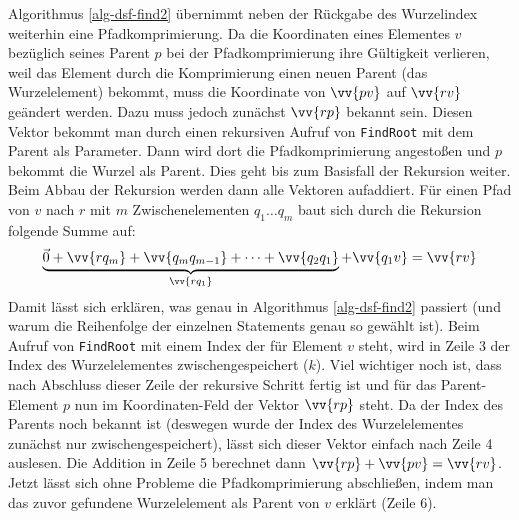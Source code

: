 \documentclass{whswinvcbook}
\begin{document}
Algorithmus \ref{alg-dsf-find2} übernimmt neben der Rückgabe des Wurzelindex weiterhin eine Pfadkomprimierung. Da die Koordinaten eines Elementes $v$ bezüglich seines Parent $p$ bei der Pfadkomprimierung ihre Gültigkeit verlieren, weil das Element durch die Komprimierung einen neuen Parent (das Wurzelelement) bekommt, muss die Koordinate von $\vv{pv}$ auf $\vv{rv}$ geändert werden. Dazu muss jedoch zunächst $\vv{rp}$ bekannt sein. Diesen Vektor bekommt man durch einen rekursiven Aufruf von \texttt{FindRoot} mit dem Parent als Parameter. Dann wird dort die Pfadkomprimierung angestoßen und $p$ bekommt die Wurzel als Parent. Dies geht bis zum Basisfall der Rekursion weiter. Beim Abbau der Rekursion werden dann alle Vektoren aufaddiert. Für einen Pfad von $v$ nach $r$ mit $m$ Zwischenelementen $q_1\dots q_m$ baut sich durch die Rekursion folgende Summe auf:$$\underbrace{\vec{0}+\vv{r q_m}+\vv{q_m q_{m-1}}+\dots+\vv{q_2 q_1}}_{\vv{r q_1}}+\vv{q_1 v}=\vv{r v}$$
Damit lässt sich erklären, was genau in Algorithmus \ref{alg-dsf-find2} passiert (und warum die Reihenfolge der einzelnen Statements genau so gewählt ist). Beim Aufruf von \texttt{FindRoot} mit einem Index der für Element $v$ steht, wird in Zeile 3 der Index des Wurzelelementes zwischengespeichert ($k$). Viel wichtiger noch ist, dass nach Abschluss dieser Zeile der rekursive Schritt fertig ist und für das Parent-Element $p$ nun im Koordinaten-Feld der Vektor $\vv{rp}$ steht. Da der Index des Parents noch bekannt ist (deswegen wurde der Index des Wurzelelementes zunächst nur zwischengespeichert), lässt sich dieser Vektor einfach nach Zeile 4 auslesen. Die Addition in Zeile 5 berechnet dann $\vv{rp}+\vv{pv}=\vv{rv}$. Jetzt lässt sich ohne Probleme die Pfadkomprimierung abschließen, indem man das zuvor gefundene Wurzelelement als Parent von $v$ erklärt (Zeile 6).
\end{document}
